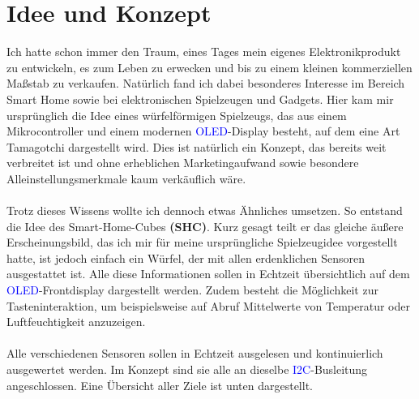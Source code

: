\section{Idee und Konzept}
Ich hatte schon immer den Traum, eines Tages mein eigenes Elektronikprodukt zu entwickeln, es zum Leben zu erwecken und bis zu einem kleinen kommerziellen Maßstab zu verkaufen.
Natürlich fand ich dabei besonderes Interesse im Bereich Smart Home sowie bei elektronischen Spielzeugen und Gadgets.
Hier kam mir ursprünglich die Idee eines würfelförmigen Spielzeugs, das aus einem Mikrocontroller und einem modernen \textcolor{blue}{OLED}-Display besteht, auf dem eine Art Tamagotchi dargestellt wird.
Dies ist natürlich ein Konzept, das bereits weit verbreitet ist und ohne erheblichen Marketingaufwand sowie besondere Alleinstellungsmerkmale kaum verkäuflich wäre.
\\\\
Trotz dieses Wissens wollte ich dennoch etwas Ähnliches umsetzen. So entstand die Idee des Smart-Home-Cubes \textbf{(SHC)}.
Kurz gesagt teilt er das gleiche äußere Erscheinungsbild, das ich mir für meine ursprüngliche Spielzeugidee vorgestellt hatte,
ist jedoch einfach ein Würfel, der mit allen erdenklichen Sensoren ausgestattet ist.
Alle diese Informationen sollen in Echtzeit übersichtlich auf dem \textcolor{blue}{OLED}-Frontdisplay dargestellt werden.
Zudem besteht die Möglichkeit zur Tasteninteraktion, um beispielsweise auf Abruf Mittelwerte von Temperatur oder Luftfeuchtigkeit anzuzeigen.
\\\\
Alle verschiedenen Sensoren sollen in Echtzeit ausgelesen und kontinuierlich ausgewertet werden.
Im Konzept sind sie alle an dieselbe \textcolor{blue}{I2C}-Busleitung angeschlossen.
Eine Übersicht aller Ziele ist unten dargestellt.
